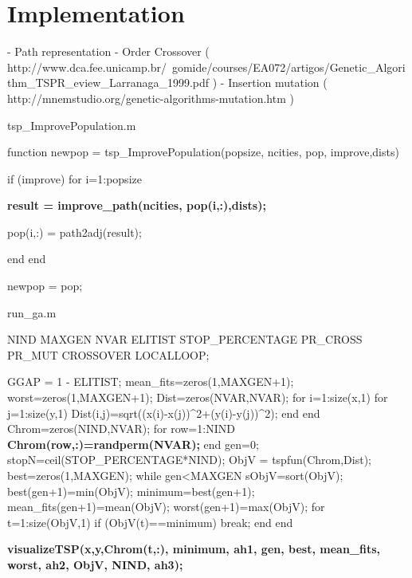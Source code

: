\section{Implementation}
    - Path representation
    - Order Crossover ( http://www.dca.fee.unicamp.br/~gomide/courses/EA072/artigos/Genetic_Algorithm_TSPR_eview_Larranaga_1999.pdf )
    - Insertion mutation ( http://mnemstudio.org/genetic-algorithms-mutation.htm )

tsp_ImprovePopulation.m

function newpop = tsp_ImprovePopulation(popsize, ncities, pop, improve,dists)

if (improve)
   for i=1:popsize
     
     \textbf{result = improve_path(ncities, pop(i,:),dists);}
  
     pop(i,:) = path2adj(result);

   end
end

newpop = pop;


run_ga.m

{NIND MAXGEN NVAR ELITIST STOP_PERCENTAGE PR_CROSS PR_MUT CROSSOVER LOCALLOOP};

        GGAP = 1 - ELITIST;
        mean_fits=zeros(1,MAXGEN+1);
        worst=zeros(1,MAXGEN+1);
        Dist=zeros(NVAR,NVAR);
        for i=1:size(x,1)
            for j=1:size(y,1)
                Dist(i,j)=sqrt((x(i)-x(j))^2+(y(i)-y(j))^2);
            end
        end
        Chrom=zeros(NIND,NVAR);
        for row=1:NIND
            \textbf{Chrom(row,:)=randperm(NVAR);}
        end
        gen=0;
        stopN=ceil(STOP_PERCENTAGE*NIND);
        ObjV = tspfun(Chrom,Dist);
        best=zeros(1,MAXGEN);
        while gen<MAXGEN
            sObjV=sort(ObjV);
          	best(gen+1)=min(ObjV);
        	minimum=best(gen+1);
            mean_fits(gen+1)=mean(ObjV);
            worst(gen+1)=max(ObjV);
            for t=1:size(ObjV,1)
                if (ObjV(t)==minimum)
                    break;
                end
            end
            
            \textbf{visualizeTSP(x,y,Chrom(t,:), minimum, ah1, gen, best, mean_fits, worst, ah2, ObjV, NIND, ah3);}

